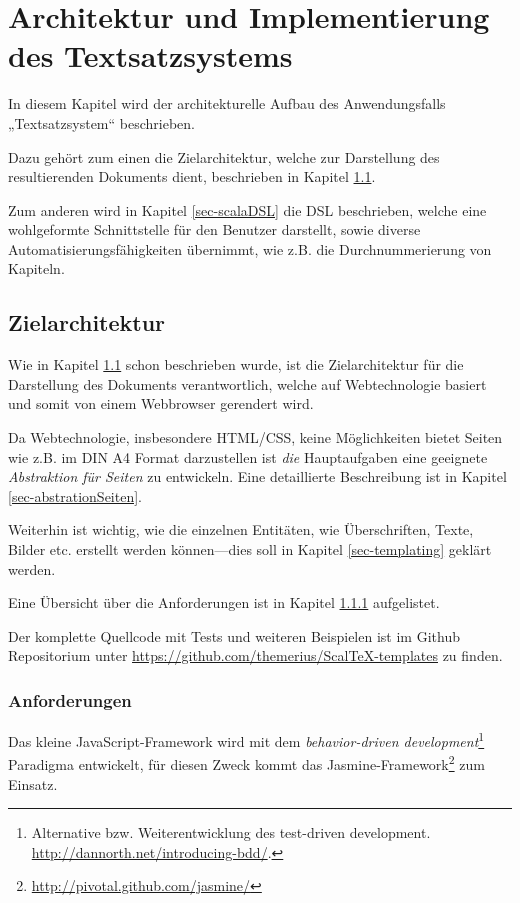 \chapter{Architektur und Implementierung des Textsatzsystems}\label{ch-architektur}

In diesem Kapitel wird der architekturelle Aufbau des Anwendungsfalls
„Textsatzsystem“ beschrieben.

Dazu gehört zum einen die Zielarchitektur,
welche zur Darstellung des resultierenden Dokuments dient, beschrieben in
Kapitel \ref{sec-zielarchitektur}.

Zum anderen wird in Kapitel \ref{sec-scalaDSL} die DSL beschrieben,
welche eine wohlgeformte Schnittstelle für den Benutzer darstellt,
sowie diverse Automatisierungs\-fähig\-keit\-en übernimmt, wie z.B.
die Durchnummerierung von Kapiteln.

\section{Zielarchitektur}\label{sec-zielarchitektur}

Wie in Kapitel \ref{sec-zielarchitektur} schon beschrieben wurde, ist die
Zielarchitektur für die Darstellung des Dokuments verantwortlich, welche
auf Webtechnologie basiert und somit von einem Webbrowser gerendert wird.

Da Webtechnologie, insbesondere HTML/CSS, keine Möglichkeiten bietet
Seiten wie z.B. im DIN A4 Format darzustellen ist \emph{die}
Hauptaufgaben eine geeignete \emph{Abstraktion für Seiten} zu entwickeln.
Eine detaillierte Beschreibung ist in Kapitel \ref{sec-abstrationSeiten}.

Weiterhin ist wichtig, wie die einzelnen Entitäten, wie Überschriften,
Texte, Bilder etc. erstellt werden können---dies soll in Kapitel
\ref{sec-templating} geklärt werden.

Eine Übersicht über die Anforderungen ist in Kapitel
\ref{sec-ziel_anforderungen} aufgelistet.

Der komplette Quellcode mit Tests und weiteren Beispielen ist im
Github Repositorium unter \url{https://github.com/themerius/ScalTeX-templates}
zu finden.

\subsection{Anforderungen}\label{sec-ziel_anforderungen}

Das kleine JavaScript-Framework wird mit dem
\emph{behavior-driven development}\footnote{
Alternative bzw. Weiterentwicklung des test-driven development.
\url{http://dannorth.net/introducing-bdd/}.}
Paradigma entwickelt, für diesen Zweck kommt das
Jasmine-Framework\footnote{\url{http://pivotal.github.com/jasmine/}}
zum Einsatz.

